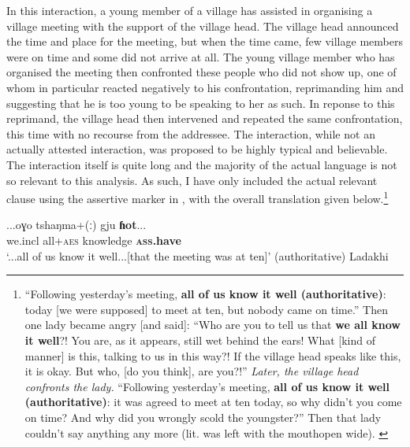 In this interaction, a young member of a village has assisted in organising a village meeting with the support of the village head. The village head announced the time and place for the meeting, but when the time came, few village members were on time and some did not arrive at all. The young village member who has organised the meeting then confronted these people who did not show up, one of whom in particular reacted negatively to his confrontation, reprimanding him and suggesting that he is too young to be speaking to her as such. In reponse to this reprimand, the village head then intervened and repeated the same confrontation, this time with no recourse from the addressee. The interaction, while not an actually attested interaction, was proposed to be highly typical and believable. The interaction itself is quite long and the majority of the actual language is not so relevant to this analysis. As such, I have only included the actual relevant clause using the assertive marker in , with the overall translation given below.\footnote{``Following yesterday's meeting, \textbf{all of us know it well (authoritative)}: today [we were supposed] to meet at ten, but nobody came on time.'' Then one lady became angry [and said]: ``Who are you to tell us that \textbf{we all know it well}?! You are, as it appears, still wet behind the ears! What [kind of manner] is this, talking to us in this way?! If the village head speaks like this, it is okay. But who, [do you think], are you?!'' \textit{Later, the village head confronts the lady.} ``Following yesterday's meeting, \textbf{all of us know it well (authoritative)}: it was agreed to meet at ten today, so why didn't you come on time? And why did you wrongly scold the youngster?'' Then that lady couldn't say anything any more (lit. was left with the mouthopen wide). \cite[77]{ZeislerForthcoming}}

\begin{exe}
    \ex\label{e:Discussion:Ladakhi}
    \gll ...oɣo tshaŋma+(ː) gju \textbf{ɦot}... \\
    we.incl all+\textsc{aes} knowledge \textbf{\textsc{ass}.have} \\
    \glt `...all of us know it well...[that the meeting was at ten]' (authoritative)
    Ladakhi \cite[Tibetic:India,][77]{ZeislerForthcoming}
\end{exe}

